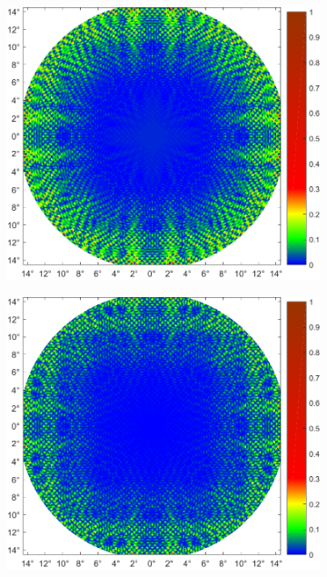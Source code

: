 \begin{figure}
\begin{subfigure}[b]{0.48\textwidth}
	\end{subfigure}
	\par \vspace{1.5\bigskipamount}
	\begin{subfigure}[b]{0.48\textwidth}
		\includegraphics[width=\textwidth]{images/fig_sim_relerror_thibault-r100-bd1e-3.pdf}
	\end{subfigure}\hfill
	\begin{subfigure}[b]{0.48\textwidth}
		\includegraphics[width=\textwidth]{images/fig_sim_relerror_multislice-r100-bd1e-3.pdf}

\end{subfigure}
\end{figure}
